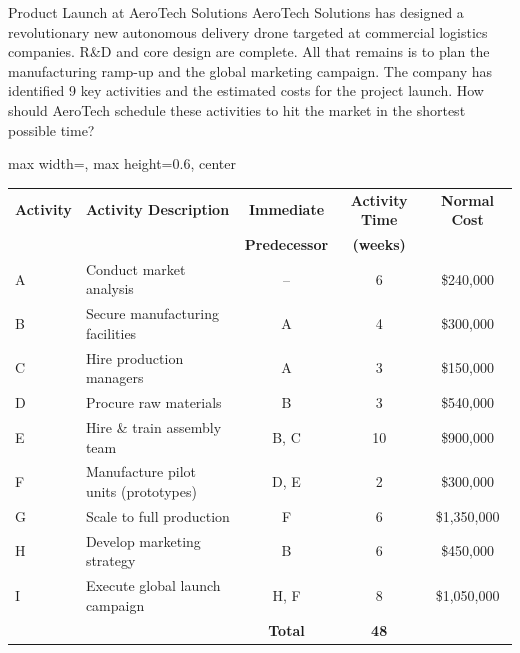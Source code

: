 \documentclass[11pt,aspectratio=169]{beamer}
\begin{document}
\begin{frame}{Product Launch at AeroTech Solutions}
    \small
    AeroTech Solutions has designed a revolutionary new autonomous delivery drone targeted at commercial logistics companies. R\&D and core design are complete. All that remains is to plan the manufacturing ramp-up and the global marketing campaign. The company has identified 9 key activities and the estimated costs for the project launch. How should AeroTech schedule these activities to hit the market in the shortest possible time?
    
    \vspace{0.5em}
    \begin{adjustbox}{max width=\linewidth, max height=0.6\textheight, center}
    \begin{tabular}{llccc}
        \toprule
        \textbf{Activity} & \textbf{Activity Description} & \textbf{Immediate} & \textbf{Activity Time} & \textbf{Normal Cost} \\
        & & \textbf{Predecessor} & \textbf{(weeks)} & \\
        \midrule
        A & Conduct market analysis & -- & 6 & \$240,000 \\
        B & Secure manufacturing facilities & A & 4 & \$300,000 \\
        C & Hire production managers & A & 3 & \$150,000 \\
        D & Procure raw materials & B & 3 & \$540,000 \\
        E & Hire \& train assembly team & B, C & 10 & \$900,000 \\
        F & Manufacture pilot units (prototypes) & D, E & 2 & \$300,000 \\
        G & Scale to full production & F & 6 & \$1,350,000 \\
        H & Develop marketing strategy & B & 6 & \$450,000 \\
        I & Execute global launch campaign & H, F & 8 & \$1,050,000 \\
        \midrule
        & & \textbf{Total} & \textbf{48} & \\
        \bottomrule
    \end{tabular}
    \end{adjustbox}
\end{frame}
\end{document}
